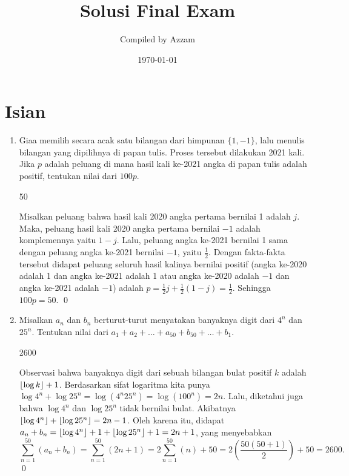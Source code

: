 \documentclass[12pt]{scrartcl}
\title{Solusi Final Exam}
\author{Compiled by Azzam}
\date{\today}
\begin{document}
\maketitle

\renewcommand*\contentsname{Daftar Isi}
\tableofcontents

\newpage

\section{Isian}
\begin{enumerate}[resume]
    \item Giaa memilih secara acak satu bilangan dari himpunan $\{1,-1\}$, lalu menulis bilangan yang dipilihnya di papan tulis. Proses tersebut dilakukan 2021 kali. Jika $p$ adalah peluang di mana hasil kali ke-2021 angka di papan tulis adalah positif, tentukan nilai dari $100p$.

    \begin{jawaban}
        50
    \end{jawaban}
    \begin{solusi}
        Misalkan peluang bahwa hasil kali 2020 angka pertama bernilai 1 adalah $j$. Maka, peluang hasil kali 2020 angka pertama bernilai $-1$ adalah komplemennya yaitu $1-j$. Lalu, peluang angka ke-2021 bernilai 1 sama dengan peluang angka ke-2021 bernilai $-1$, yaitu $\frac{1}{2}$. Dengan fakta-fakta tersebut didapat peluang seluruh hasil kalinya bernilai positif (angka ke-2020 adalah 1 dan angka ke-2021 adalah 1 atau angka ke-2020 adalah $-1$ dan angka ke-2021 adalah $-1$) adalah $p=\frac{1}{2}j+\frac{1}{2}(1-j) = \frac{1}{2}$. Sehingga $100p = 50$. \qed
    \end{solusi}
	
	
    \item Misalkan $a_n$ dan $b_n$ berturut-turut menyatakan banyaknya digit dari $4^n$ dan $25^n$. Tentukan nilai dari $a_1+a_2+\dots +a_{50}+b_{50}+\dots+b_1$.
    \begin{jawaban}
        2600
    \end{jawaban}
    \begin{solusi}
        Observasi bahwa banyaknya digit dari sebuah bilangan bulat positif $k$ adalah $\left\lfloor \log k \right\rfloor+1$. Berdasarkan sifat logaritma kita punya $\log 4^n + \log 25^n = \log (4^n25^n) = \log (100^n) = 2n$. Lalu, diketahui juga bahwa $\log 4^n$ dan $\log 25^n$ tidak bernilai bulat. Akibatnya $\left\lfloor \log 4^n \right\rfloor+\left\lfloor \log 25^n \right\rfloor = 2n-1$. Oleh karena itu, didapat $a_n+b_n =\left\lfloor \log 4^n \right\rfloor+1+\left\lfloor \log 25^n \right\rfloor+1= 2n+1$, yang menyebabkan $$\sum_{n=1}^{50}(a_n+b_n)=\sum_{n=1}^{50}(2n+1)=2\sum_{n=1}^{50}(n)+50=2\left(\frac{50(50+1)}{2}\right)+50=2600.$$ \qed
    \end{solusi}
	

\end{enumerate}
\end{document}
